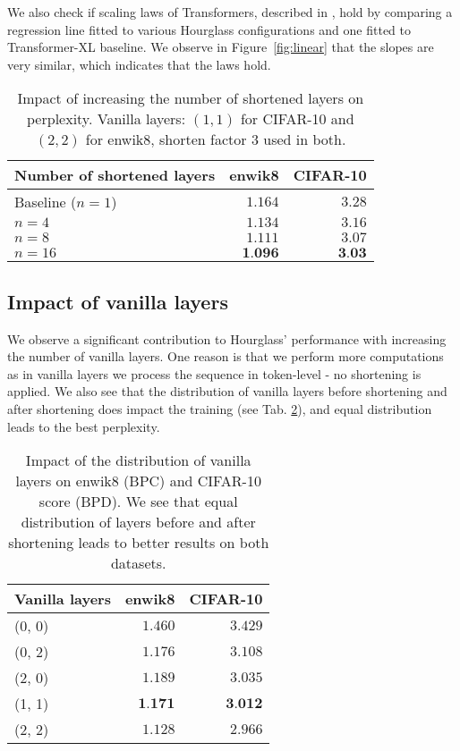 \documentclass[11pt]{article}
\begin{document}
We also check if scaling laws of Transformers, described in \cite{kaplan2020scaling}, hold by comparing a regression line fitted to various Hourglass configurations and one fitted to Transformer-XL baseline. We observe in Figure~\ref{fig:linear} that the slopes are very similar, which indicates that the laws hold.

\begin{table}[ht!]
\small
\centering
\setlength{\tabcolsep}{0.95em}
\begin{tabular}{lrr}
\hline 
Number of shortened layers & enwik8 & CIFAR-10\\
\hline
Baseline ($n=1$) & $1.164$ & $3.28$ \\
\hline
$n=4$ & $1.134$ & $3.16$ \\
$n=8$ & $1.111$ & $3.07$ \\
$n=16$ & $\textbf{1.096}$ & $\textbf{3.03}$ \\
\hline
\end{tabular}
\caption{Impact of increasing the number of shortened layers on perplexity.
Vanilla layers: $(1,1)$ for CIFAR-10 and $(2,2)$ for enwik8, shorten factor $3$ used in both.
}
\label{tab:scaling}
\end{table}


\vspace{-5mm}
\subsection{Impact of vanilla layers}\label{sec:vanilla}
We observe a significant contribution to Hourglass' performance with increasing the number of vanilla layers. One reason is that we perform more computations as in vanilla layers we process the sequence in token-level - no shortening is applied. We also see that the distribution of vanilla layers before shortening and after shortening does impact the training (see Tab. \ref{tab:vanilla}), and equal distribution leads to the best perplexity. 


\begin{table}[ht!]
\small
\centering
\setlength{\tabcolsep}{1.9em}
\begin{tabular}{lrr}
\hline
Vanilla layers & enwik8 & CIFAR-10 \\
\hline
(0, 0) & $1.460$ & $3.429$ \\ 
\hline
(0, 2) & $1.176$ & $3.108$ \\
(2, 0) & $1.189$ & $3.035$ \\
(1, 1) & $\textbf{1.171}$ & $\textbf{3.012}$ \\
\hline
(2, 2) & $1.128$ & $2.966$ \\
\hline
\end{tabular}
\caption{Impact of the distribution of vanilla layers on enwik8 (BPC) and CIFAR-10 score (BPD). We see that equal distribution of layers before and after shortening leads to better results on both datasets.}
\label{tab:vanilla}
\end{table}
\end{document}
